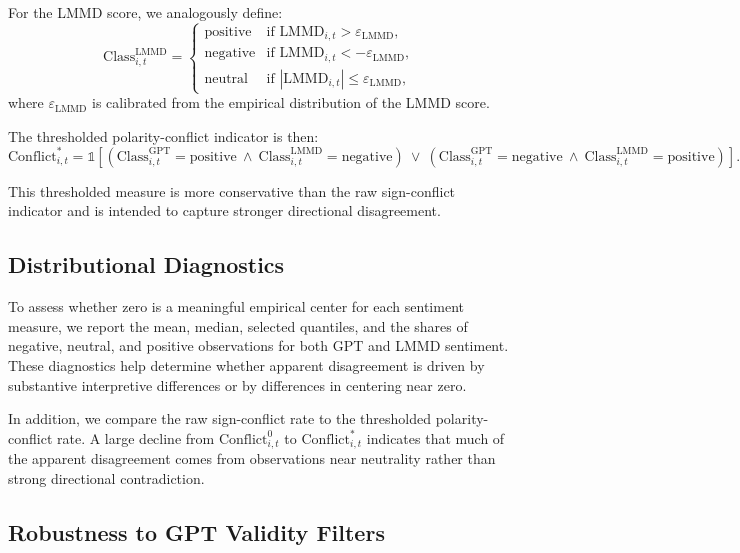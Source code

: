 For the LMMD score, we analogously define:
\begin{equation}
\text{Class}^{\text{LMMD}}_{i,t} =
\begin{cases}
\text{positive} & \text{if } \text{LMMD}_{i,t} > \varepsilon_{\text{LMMD}}, \\
\text{negative} & \text{if } \text{LMMD}_{i,t} < -\varepsilon_{\text{LMMD}}, \\
\text{neutral}  & \text{if } |\text{LMMD}_{i,t}| \le \varepsilon_{\text{LMMD}},
\end{cases}
\end{equation}
where $\varepsilon_{\text{LMMD}}$ is calibrated from the empirical distribution
of the LMMD score.

The thresholded polarity-conflict indicator is then:
\begin{equation}
\text{Conflict}^{\ast}_{i,t} =
\mathbb{1}\!\left[
\left( \text{Class}^{\text{GPT}}_{i,t} = \text{positive}
\ \wedge \
\text{Class}^{\text{LMMD}}_{i,t} = \text{negative} \right)
\ \vee \
\left( \text{Class}^{\text{GPT}}_{i,t} = \text{negative}
\ \wedge \
\text{Class}^{\text{LMMD}}_{i,t} = \text{positive} \right)
\right].
\end{equation}

This thresholded measure is more conservative than the raw sign-conflict
indicator and is intended to capture stronger directional disagreement.

\subsection{Distributional Diagnostics}
\label{app:disagreement_distributional}

To assess whether zero is a meaningful empirical center for each sentiment
measure, we report the mean, median, selected quantiles, and the shares of
negative, neutral, and positive observations for both GPT and LMMD sentiment.
These diagnostics help determine whether apparent disagreement is driven by
substantive interpretive differences or by differences in centering near zero.

In addition, we compare the raw sign-conflict rate to the thresholded
polarity-conflict rate. A large decline from $\text{Conflict}^{0}_{i,t}$ to
$\text{Conflict}^{\ast}_{i,t}$ indicates that much of the apparent disagreement
comes from observations near neutrality rather than strong directional
contradiction.

\subsection{Robustness to GPT Validity Filters}
\label{app:disagreement_validity}

